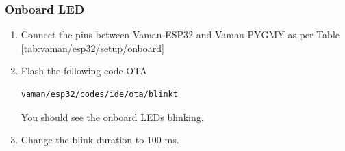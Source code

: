 \subsubsection{Onboard LED}
\renewcommand{\theequation}{\theenumi}
\renewcommand{\thefigure}{\theenumi}
\begin{enumerate}[label=\thesection.\arabic*.,ref=\thesection.\theenumi]
\fi
\item Connect the pins between Vaman-ESP32 and Vaman-PYGMY as per Table \ref{tab:vaman/esp32/setup/onboard}
\begin{table}[h]
\centering

\caption{}
\label{tab:vaman/esp32/setup/onboard}
\end{table}
\item Flash the following code OTA
\begin{lstlisting}
vaman/esp32/codes/ide/ota/blinkt
\end{lstlisting}
You should see the onboard LEDs blinking.
\item Change the blink duration to 100 ms.
\end{enumerate}

